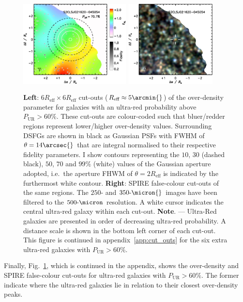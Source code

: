 \documentclass[a4paper, fleqn, usenatbib]{mnras}
\newcommand{\pur}{P_{\text{UR}}}
\newcommand{\reff}{R_{\text{eff}}}
\newcommand{\urgs}{ultra-red galaxies}
\begin{document}
\begin{figure}
    \includegraphics[width=0.5\textwidth]{S2CLSJ021620-045054-overdensity}
    \includegraphics[width=0.41\textwidth]{S2CLSJ021620-045054-spire-rgb}
    \caption{\textbf{Left}: $6\reff{}\times6\reff{}$ cut-outs ($\reff{}\approx5\arcmin{}$) of the over-density parameter for galaxies with an ultra-red probability above $\pur{}>60\%$.
    These cut-outs are colour-coded such that bluer/redder regions represent lower/higher over-density values.
    Surrounding DSFGs are shown in black as Gaussian PSFs with FWHM of $\theta=14\arcsec{}$ that are integral normalised to their respective fidelity parameters.
    I show contours representing the $10$, $30$ (dashed black), $50$, $70$ and $99\%$ (white) values of the Gaussian aperture adopted, i.e.\ the aperture FHWM of $\theta=2\reff{}$ is indicated by the furthermost white contour.
    \textbf{Right}: SPIRE false-colour cut-outs of the same regions.
    The $250\text{-}$ and $350\text{-}\micron{}$ images have been filtered to the $500\text{-}\micron$ resolution.
    A white cursor indicates the central ultra-red galaxy within each cut-out.
    \textbf{Note}. --- Ultra-Red galaxies are presented in order of decreasing ultra-red probability.
    A distance scale is shown in the bottom left corner of each cut-out.
    This figure is continued in appendix~\ref{app:cut_outs} for the six extra \urgs{} with $\pur{}>60\%$.}
    \label{fig:s2cls_cut_outs}
\end{figure}

Finally, Fig.~\ref{fig:s2cls_cut_outs}, which is continued in the appendix, shows the over-density and SPIRE false-colour cut-outs for \urgs{} with $\pur{}>60\%$.
The former indicate where the \urgs{} lie in relation to their closest over-density peaks.
\end{document}
